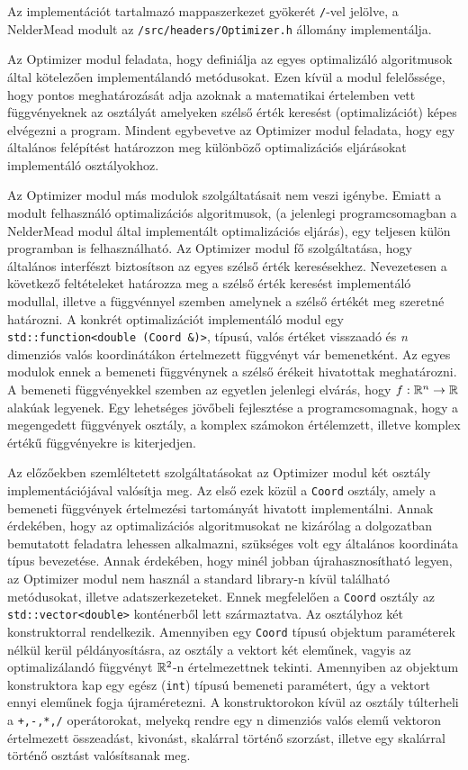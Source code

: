 \documentclass[oneside,titlepage,12pt,a4paper]{report}
\begin{document}
Az implementációt tartalmazó mappaszerkezet gyökerét \texttt{/}-vel jelölve, a NelderMead modult  az \texttt{/src/headers/Optimizer.h} állomány implementálja.
\par Az Optimizer modul feladata, hogy definiálja az egyes optimalizáló algoritmusok által kötelezően implementálandó metódusokat. Ezen kívül a modul felelőssége, hogy pontos meghatározását adja azoknak a matematikai értelemben vett függvényeknek az osztályát amelyeken szélső érték keresést (optimalizációt) képes elvégezni a program. Mindent egybevetve az Optimizer modul feladata, hogy egy általános felépítést határozzon meg különböző optimalizációs eljárásokat implementáló osztályokhoz. 
\par Az Optimizer modul más modulok szolgáltatásait nem veszi igénybe. Emiatt a modult felhasználó optimalizációs algoritmusok, (a jelenlegi programcsomagban a NelderMead modul által implementált optimalizációs eljárás), egy teljesen külön programban is felhasználható. Az Optimizer modul fő szolgáltatása, hogy általános interfészt biztosítson az egyes szélső érték keresésekhez. Nevezetesen a következő feltételeket határozza meg a szélső érték keresést implementáló modullal, illetve a függvénnyel szemben amelynek a szélső értékét meg szeretné határozni. A konkrét optimalizációt implementáló modul egy \texttt{std::function<double (Coord \&)>}, típusú, valós értéket visszaadó és \textit{n} dimenziós valós koordinátákon értelmezett függvényt vár bemenetként. Az egyes modulok ennek a bemeneti függvénynek a szélső érékeit hivatottak meghatározni. A bemeneti függvényekkel szemben az egyetlen jelenlegi elvárás, hogy $f : \Bbb R^n \to \Bbb R$ alakúak legyenek. Egy lehetséges jövőbeli fejlesztése a programcsomagnak, hogy a megengedett függvények osztály, a komplex számokon értélemzett, illetve komplex értékű függvényekre is kiterjedjen.
\par Az előzőekben szemléltetett szolgáltatásokat az Optimizer modul két osztály implementációjával valósítja meg. Az első ezek közül a \texttt{Coord} osztály, amely a bemeneti függvények értelmezési tartományát hivatott implementálni. Annak érdekében, hogy az optimalizációs algoritmusokat ne kizárólag a dolgozatban bemutatott feladatra lehessen alkalmazni, szükséges volt egy általános koordináta típus bevezetése. Annak érdekében, hogy minél jobban újrahasznosítható legyen, az Optimizer modul nem használ a standard library-n kívül található metódusokat, illetve adatszerkezeteket. Ennek megfelelően a \texttt{Coord} osztály az \texttt{std::vector<double>} konténerből lett származtatva. Az osztályhoz két konstruktorral rendelkezik. Amennyiben egy \texttt{Coord} típusú objektum paraméterek nélkül kerül példányosításra, az osztály a vektort két eleműnek, vagyis az optimalizálandó függvényt $ \Bbb R^2 $-n értelmezettnek tekinti. Amennyiben az objektum konstruktora kap egy egész (\texttt{int}) típusú bemeneti paramétert, úgy a vektort ennyi eleműnek fogja újraméretezni. A konstruktorokon kívül az osztály túlterheli a \texttt{+,-,*,/} operátorokat, melyekq rendre egy n dimenziós valós elemű vektoron értelmezett összeadást, kivonást, skalárral történő szorzást, illetve egy skalárral történő osztást valósítsanak meg.       
\end{document}
